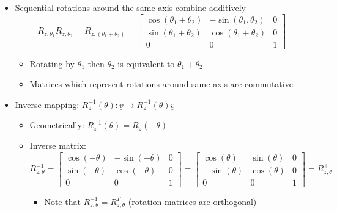 \documentclass{article}
\begin{document}
\begin{itemize}
    \begin{itemize}
        \item Orthogonal basis if $\underline{e}_i \cdot \underline{e}_j = 0$
        \item Orthonormal basis if $\underline{e}_i \cdot \underline{e}_j = 0$ and $\vert \vert e_{i} \vert \vert = \vert \vert e_{j} \vert \vert = 1$
    \end{itemize}
    \item Sequential rotations around the same axis combine additively
    \[
    R_{z,\theta_1}R_{z,\theta_2} = R_{z,(\theta_1+\theta_2)} = \left[ \begin{array}{ccc}
        \cos(\theta_1 + \theta_2) & -\sin(\theta_1,\theta_2) & 0 \\
        \sin(\theta_1+\theta_2) & \cos(\theta_1 + \theta_2) & 0 \\
        0 & 0 & 1
    \end{array} \right]
    \]
    \begin{itemize}
        \item Rotating by $\theta_1$ then $\theta_2$ is equivalent to $\theta_1 + \theta_2$
        \item Matrices which represent rotations around same axis are commutative
    \end{itemize}
    \item Inverse mapping: $R_z^{-1}(\theta) : \underline{v} \rightarrow R_z^{-1}(\theta) \underline{v}$
    \begin{itemize}
        \item Geometrically: $R_z^{-1}(\theta)=R_z(-\theta)$
        \item Inverse matrix:
        \[
        R_{z,\theta}^{-1} = \left[ \begin{array}{ccc}
            \cos(-\theta) & -\sin(-\theta) & 0 \\
            \sin(-\theta) & \cos(-\theta) & 0 \\
            0 & 0 & 1
        \end{array} \right] = \left[ \begin{array}{ccc}
            \cos(\theta) & \sin(\theta) & 0 \\
            -\sin(\theta) & \cos(\theta) & 0 \\
            0 & 0 & 1
        \end{array} \right] = R_{z,\theta}^\top
        \]
        \begin{itemize}
            \item Note that $R_{z,\theta}^{-1} = R_{z,\theta}^T$ (rotation matrices are orthogonal)

\end{itemize}
\end{itemize}
\end{itemize}
\end{document}
